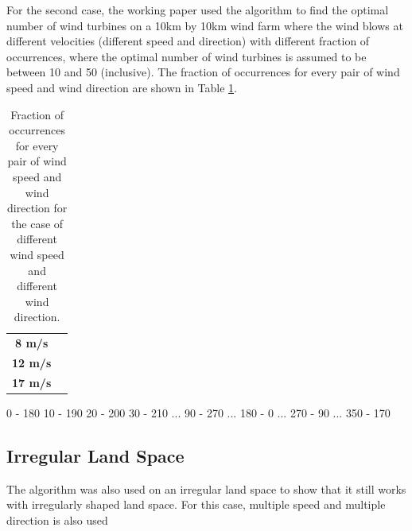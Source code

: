     For the second case, the working paper used the algorithm to find the optimal number of wind turbines on a 10km by 10km wind farm where the wind blows at different velocities (different speed and direction) with different fraction of occurrences, where the optimal number of wind turbines is assumed to be between 10 and 50 (inclusive). The fraction of occurrences for every pair of wind speed and wind direction are shown in Table \ref{fracOfOccur}.
    \begin{table}[h]
        \centering
        \begin{tabular}{|c|c|} \hline
             &  \\ \hline
            \textbf{8 m/s} &  \\ \hline
            \textbf{12 m/s} &  \\ \hline
            \textbf{17 m/s} &  \\ \hline
        \end{tabular}
        \caption{Fraction of occurrences for every pair of wind speed and wind direction for the case of different wind speed and different wind direction.}
        \label{fracOfOccur}
    \end{table}
    
    
    0 - 180
    10 - 190
    20 - 200
    30 - 210
    ...
    90 - 270
    ...
    180 - 0
    ...
    270 - 90
    ...
    350 - 170
    
    \subsection{Irregular Land Space}
    The algorithm was also used on an irregular land space to show that it still works with irregularly shaped land space. For this case, multiple speed and multiple direction is also used 
    
    
    
    
